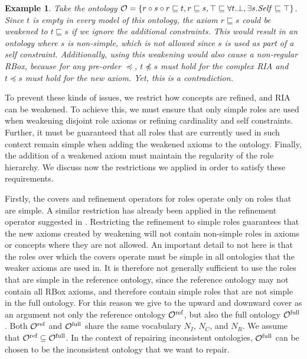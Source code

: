 \documentclass[
]{ceurart}
\newtheorem{example}{Example}
\begin{document}
\begin{example}
  Take the ontology $\mathcal{O} = \{ r \circ s \circ r \sqsubseteq t, r \sqsubseteq s, \top \sqsubseteq \forall t.\bot, \exists s.\mathit{Self} \sqsubseteq \top \}$. Since $t$ is empty in every model of this ontology, the axiom $r \sqsubseteq s$ could be weakened to $t \sqsubseteq s$ if we ignore the additional constraints. This would result in an ontology where $s$ is non-simple, which is not allowed since $s$ is used as part of a self constraint.
  Additionally, using this weakening would also cause a non-regular RBox, because for any pre-order $\preceq$, $t \not\preceq s$ must hold for the complex RIA and $t \preceq s$ must hold for the new axiom. Yet, this is a contradiction.
\end{example}

To prevent these kinds of issues, we restrict how concepts are refined, and RIA can be weakened. To achieve this, we must ensure that only simple roles are used when weakening disjoint role axioms or refining cardinality and self constraints. Further, it must be guaranteed that all roles that are currently used in such context remain simple when adding the weakened axioms to the ontology. Finally, the addition of a weakened axiom must maintain the regularity of the role hierarchy. We discuss now the restrictions we applied in order to satisfy these requirements.

Firstly, the covers and refinement operators for roles operate only on roles that are simple. A similar restriction has already been applied in the refinement operator suggested in \cite{confalonieri2020towards}. Restricting the refinement to simple roles guarantees that the new axioms created by weakening will not contain non-simple roles in axioms or concepts where they are not allowed. An important detail to not here is that the roles over which the covers operate must be simple in all ontologies that the weaker axioms are used in. It is therefore not generally sufficient to use the roles that are simple in the reference ontology, since the reference ontology may not contain all RBox axioms, and therefore contain simple roles that are not simple in the full ontology. For this reason we give to the upward and downward cover as an argument not only the reference ontology ${\mathcal{O}^\textnormal{ref}}$, but also the full ontology ${\mathcal{O}^\textnormal{full}}$. Both ${\mathcal{O}^\textnormal{ref}}$ and ${\mathcal{O}^\textnormal{full}}$ share the same vocabulary $N_I$, $N_C$, and $N_R$. We assume that ${\mathcal{O}^\textnormal{ref}} \subseteq {\mathcal{O}^\textnormal{full}}$. In the context of repairing inconsistent ontologies, ${\mathcal{O}^\textnormal{full}}$ can be chosen to be the inconsistent ontology that we want to repair.
\end{document}
